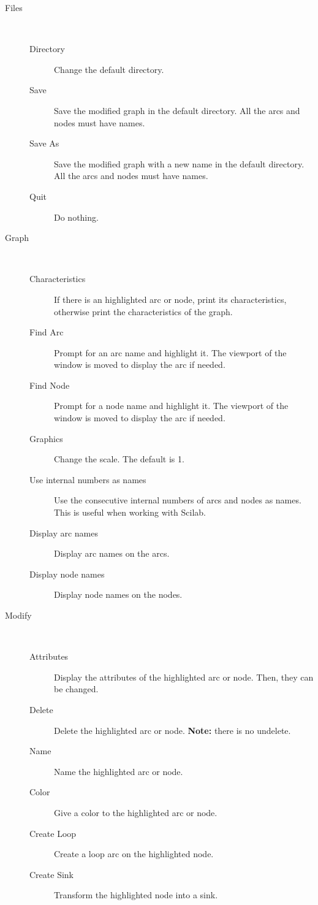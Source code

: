 \documentclass[11pt]{article}
\begin{document}
\begin{description}
\item[Files]\ 
\begin{description}
  \item[Directory] Change the default directory.
  \item[Save] Save the modified graph in the default directory. All 
	the arcs and nodes must have names.
  \item[Save As] Save the modified graph with a new name in the
	default directory.
	All the arcs and nodes must have names.
  \item[Quit] Do nothing.
\end{description}
\item[Graph]\ 
\begin{description}
  \item[Characteristics] If there is an highlighted arc or node, print its
	characteristics, otherwise print the characteristics 
	of the graph.
  \item[Find Arc] Prompt for an arc name and highlight it. The viewport of the
	window is moved to display the arc if needed.
  \item[Find Node]  Prompt for a node name and highlight it. The
	viewport of the window is moved to display the arc if needed.
  \item[Graphics] Change the scale. The default is 1.
  \item[Use internal numbers as names] Use the consecutive internal numbers of
	arcs and nodes as names. This is useful 
	when working with Scilab.
  \item[Display arc names] Display arc names on the arcs.
  \item[Display node names] Display node names on the nodes.
\end{description}
\item[Modify]\ 
\begin{description}
  \item[Attributes] Display the attributes of the highlighted arc or
	node. Then, they can be changed.
  \item[Delete] Delete the highlighted arc or node. 
	\textbf{Note:} there is no undelete.
  \item[Name] Name the highlighted arc or node.
  \item[Color] Give a color to the highlighted arc or node.
  \item[Create Loop] Create a loop arc on the highlighted node.
  \item[Create Sink] Transform the highlighted node into a sink.

\end{description}
\end{description}
\end{document}
